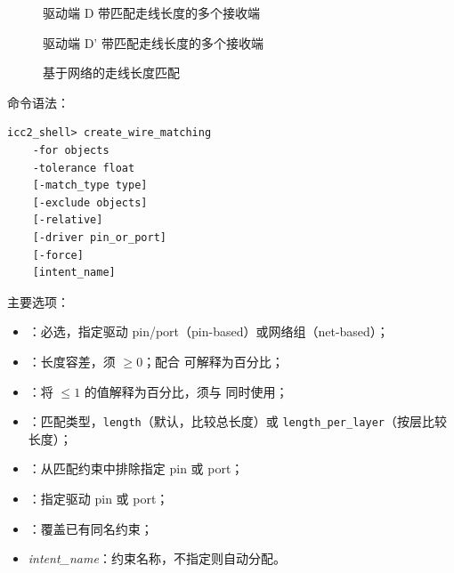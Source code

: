 \begin{figure}[htbp]
\centering
{}
\caption{驱动端 D 带匹配走线长度的多个接收端}
\label{fig:matched-length-D}
\end{figure}

\begin{figure}[htbp]
\centering
{}
\caption{驱动端 D' 带匹配走线长度的多个接收端}
\label{fig:matched-length-Dprime}
\end{figure}

\begin{figure}[htbp]
\centering
{}
\caption{基于网络的走线长度匹配}
\label{fig:net-based-matching}
\end{figure}

命令语法：
\begin{lstlisting}
icc2_shell> create_wire_matching
    -for objects
    -tolerance float
    [-match_type type]
    [-exclude objects]
    [-relative]
    [-driver pin_or_port]
    [-force]
    [intent_name]
\end{lstlisting}

主要选项：
\begin{itemize}
  \item {}：必选，指定驱动 pin/port（pin-based）或网络组（net-based）；
  \item {}：长度容差，须 $\ge 0$；配合  可解释为百分比；
  \item {}：将  $\le 1$ 的值解释为百分比，须与  同时使用；
  \item {}：匹配类型，\texttt{length}（默认，比较总长度）或 \texttt{length\_per\_layer}（按层比较长度）；
  \item {}：从匹配约束中排除指定 pin 或 port；
  \item {}：指定驱动 pin 或 port；
  \item {}：覆盖已有同名约束；
  \item \textit{intent\_name}：约束名称，不指定则自动分配。
\end{itemize}

